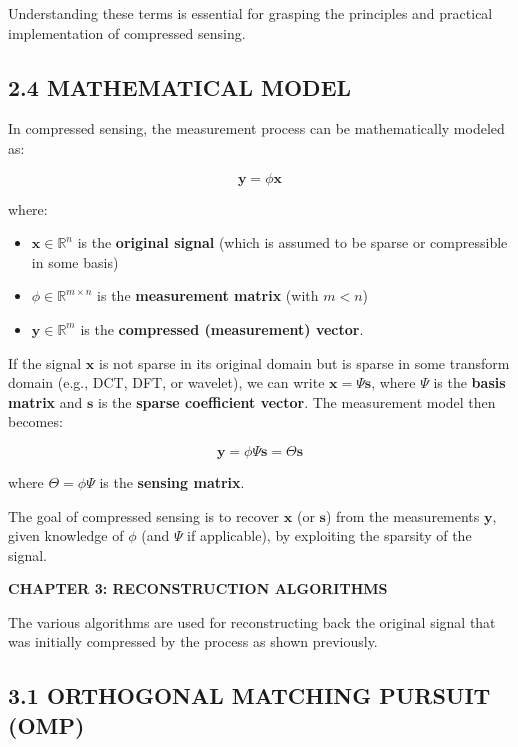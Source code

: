 \documentclass[
  letterpaper,
  DIV=11,
  numbers=noendperiod]{scrartcl}
\providecommand{\mainsection}[1]{\begin{center}{\rmfamily\textbf{\fontsize{14}{20}\selectfont #1}}\end{center}}
\begin{document}
Understanding these terms is essential for grasping the principles and
practical implementation of compressed sensing.

\subsection{2.4 MATHEMATICAL MODEL}\label{mathematical-model}

In compressed sensing, the measurement process can be mathematically
modeled as:

\begin{equation}
  \mathbf{y} = \phi \mathbf{x}
\end{equation}

where:

\begin{itemize}
\item
  \(\mathbf{x} \in \mathbb{R}^n\) is the \textbf{original signal} (which
  is assumed to be sparse or compressible in some basis)
\item
  \(\phi \in \mathbb{R}^{m \times n}\) is the \textbf{measurement
  matrix} (with \(m < n\))
\item
  \(\mathbf{y} \in \mathbb{R}^m\) is the \textbf{compressed
  (measurement) vector}.
\end{itemize}

If the signal \(\mathbf{x}\) is not sparse in its original domain but is
sparse in some transform domain (e.g., DCT, DFT, or wavelet), we can
write \(\mathbf{x} = \Psi \mathbf{s}\), where \(\Psi\) is the
\textbf{basis matrix} and \(\mathbf{s}\) is the \textbf{sparse
coefficient vector}. The measurement model then becomes:

\begin{equation}
  \mathbf{y} = \phi \Psi \mathbf{s} = \Theta \mathbf{s}
\end{equation}

where \(\Theta = \phi \Psi\) is the \textbf{sensing matrix}.

The goal of compressed sensing is to recover \(\mathbf{x}\) (or
\(\mathbf{s}\)) from the measurements \(\mathbf{y}\), given knowledge of
\(\phi\) (and \(\Psi\) if applicable), by exploiting the sparsity of the
signal.

\newpage
\mainsection{CHAPTER 3: RECONSTRUCTION ALGORITHMS}

The various algorithms are used for reconstructing back the original
signal that was initially compressed by the process as shown previously.

\subsection{3.1 ORTHOGONAL MATCHING PURSUIT
(OMP)}\label{orthogonal-matching-pursuit-omp}
\end{document}

